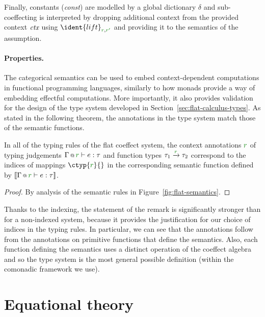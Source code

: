 Finally, constants (\emph{const}) are modelled by a global dictionary $\delta$ and sub-coeffecting
is interpreted by dropping additional context from the provided context $\textit{ctx}$ using 
$\ident{lift}_{\cclrd{r}, \cclrd{r'}}$ and providing it to the semantics of the assumption.

\paragraph{Properties.}

The categorical semantics can be used to embed context-dependent computations in functional 
programming languages, similarly to how monads provide a way of embedding effectful computations.
More importantly, it also provides validation for the design of the type system developed in 
Section~\ref{sec:flat-calculus-types}. As stated in the following theorem, the annotations in 
the type system match those of the semantic functions.

\vspace{2em}

\begin{remark}[Correspondence]
In all of the typing rules of the flat coeffect system, the context annotations $\cclrd{r}$ of typing 
judgements $\coctx{\Gamma}{\cclrd{r}} \vdash e : \tau$ and function types $\tau_1 \xrightarrow{\cclrd{r}} \tau_2$ 
correspond to the indices of mappings $\ctyp{\cclrd{r}}{}$ in the corresponding semantic function defined 
by $\sem{\coctx{\Gamma}{\cclrd{r}} \vdash e : \tau}$.
\end{remark}
\begin{proof}
By analysis of the semantic rules in Figure~\ref{fig:flat-semantics}.
\end{proof}

\noindent
Thanks to the indexing, the statement of the remark is significantly stronger than for a 
non-indexed system, because it provides the justification for our choice of indices in the typing
rules. In particular, we can see that the annotations follow from the annotations on primitive 
functions that define the semantics. Also, each function defining the semantics uses a distinct 
operation of the coeffect algebra and so the type system is the most general possible definition
(within the comonadic framework we use).


\section{Equational theory}
\label{sec:flat-syntax}

